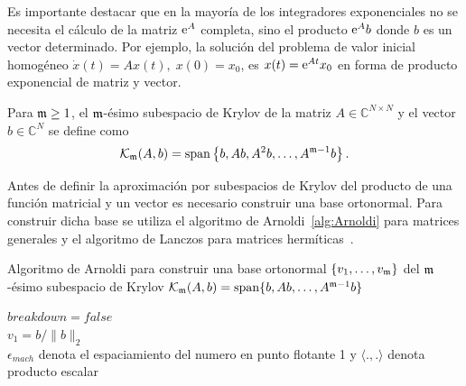 Es importante destacar que en la mayoría de los integradores exponenciales
 no se necesita el cálculo de la matriz $\mathrm{e}^{A}$ completa, sino
el producto $\mathrm{e}^{A}b$ donde $b$ es un vector determinado. Por ejemplo, la solución del problema de valor inicial homogéneo $\dot{x}(t)=Ax(t),\;x(0)=x_0$, es $x(t)=\mathrm{e}^{At}x_0$ en forma de producto exponencial de matriz y vector. 
\begin{definition}
        \cite{Saad92} Para $\mathfrak{m}\geq 1$, el $\mathfrak{m}$-ésimo subespacio de Krylov de la matriz $A\in\mathbb{C}^{N\times N}$
    y el vector $b\in\mathbb{C}^{N}$ se define como
    \[ \mathcal{K}_{\mathfrak{m}}(A,b)=\mathrm{span}\left\{ b,Ab,A^{2}b,\ldots,A^{\mathfrak{m}-1}b \right\}. \]
\end{definition}

Antes de definir la aproximación por subespacios de Krylov del producto de una función matricial y un vector es
necesario construir una base ortonormal. Para construir dicha base se utiliza el algoritmo de
Arnoldi~\ref{alg:Arnoldi} para matrices generales y el algoritmo de 
Lanczos para matrices hermíticas~\cite{arnoldi,saad2003iterative}.

\begin{algorithm}
    \caption{Algoritmo de Arnoldi para construir una base ortonormal $\{ v_1,\ldots,v_{\mathfrak{m}} \}$ del $\mathfrak{m}$-ésimo subespacio de Krylov $\mathcal{K}_{\mathfrak{m}}(A,b)=\mathrm{span} \{ b,Ab,\ldots, A^{\mathfrak{m}-1}b \}$}
    \label{alg:Arnoldi}

    $breakdown=false$\\
    $v_1=b/\lVert b \rVert_2$\\
\nonl $\epsilon_{mach}$ denota el espaciamiento del numero en punto flotante 1 y $\langle . , .\rangle$ denota producto escalar
\end{algorithm}


